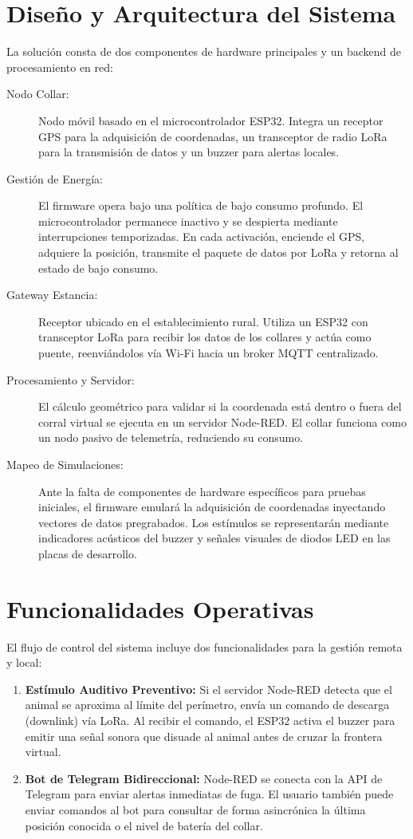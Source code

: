 \documentclass[11pt,a4paper]{article}
\begin{document}
\section{Diseño y Arquitectura del Sistema}
La solución consta de dos componentes de hardware principales y un backend de procesamiento en red:
\begin{description}
    \item[Nodo Collar:] Nodo móvil basado en el microcontrolador ESP32. Integra un receptor GPS para la adquisición de coordenadas, un transceptor de radio LoRa para la transmisión de datos y un buzzer para alertas locales.
    \item[Gestión de Energía:] El firmware opera bajo una política de bajo consumo profundo. El microcontrolador permanece inactivo y se despierta mediante interrupciones temporizadas. En cada activación, enciende el GPS, adquiere la posición, transmite el paquete de datos por LoRa y retorna al estado de bajo consumo.
    \item[Gateway Estancia:] Receptor ubicado en el establecimiento rural. Utiliza un ESP32 con transceptor LoRa para recibir los datos de los collares y actúa como puente, reenviándolos vía Wi-Fi hacia un broker MQTT centralizado.
    \item[Procesamiento y Servidor:] El cálculo geométrico para validar si la coordenada está dentro o fuera del corral virtual se ejecuta en un servidor Node-RED. El collar funciona como un nodo pasivo de telemetría, reduciendo su consumo.
    \item[Mapeo de Simulaciones:] Ante la falta de componentes de hardware específicos para pruebas iniciales, el firmware emulará la adquisición de coordenadas inyectando vectores de datos pregrabados. Los estímulos se representarán mediante indicadores acústicos del buzzer y señales visuales de diodos LED en las placas de desarrollo.
\end{description}

\section{Funcionalidades Operativas}
El flujo de control del sistema incluye dos funcionalidades para la gestión remota y local:
\begin{enumerate}
    \item \textbf{Estímulo Auditivo Preventivo:} Si el servidor Node-RED detecta que el animal se aproxima al límite del perímetro, envía un comando de descarga (downlink) vía LoRa. Al recibir el comando, el ESP32 activa el buzzer para emitir una señal sonora que disuade al animal antes de cruzar la frontera virtual.
    \item \textbf{Bot de Telegram Bidireccional:} Node-RED se conecta con la API de Telegram para enviar alertas inmediatas de fuga. El usuario también puede enviar comandos al bot para consultar de forma asincrónica la última posición conocida o el nivel de batería del collar.
\end{enumerate}
\end{document}
